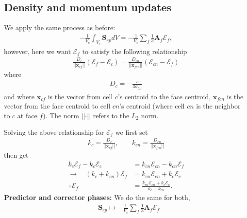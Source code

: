 \documentclass[10pt,letterpaper,notitlepage]{article}
\numberwithin{equation}{section}
\newcommand{\position}{\mathbf{x}}
\newcommand{\dotp}{\boldsymbol{\cdot}}
\newcommand{\RadE}{\mathcal{E}}
\newcommand{\AreaVec}{\mathbf{A}}
\newcommand{\beq}{\begin{equation*} \begin{aligned}}
\newcommand{\eeq}{\end{aligned}\end{equation*}}
\newcommand{\beqn}{\begin{equation}\begin{aligned}}
\newcommand{\eeqn}{\end{aligned}\end{equation}}
\begin{document}
\newpage
\subsection{Density and momentum updates} 
\label{section:fv_density_momentum_update}
We apply the same process as before:
\beqn 
-\frac{1}{V_c} \int_{V_c} \mathbf{S}_{rp} dV = -\frac{1}{V_c}  \sum_f \frac{1}{3} \AreaVec_f \RadE_f,
\eeqn 
however, here we want $\RadE_f$ to satisfy the following relationship
\beqn 
\frac{D_c}{||\position_{cf}||} (\RadE_f - \RadE_c) = 
\frac{D_{cn}}{||\position_{fcn}||} (\RadE_{cn} - \RadE_f) 
\eeqn 
where
\beqn 
D_c = -\frac{c}{3\sigma_{t,c}}
\eeqn 
and where $\position_{cf}$ is the vector from cell $c$'s centroid to the face centroid, $\position_{fcn}$ is the vector from the face centroid to cell $cn$'s centroid (where cell $cn$ is the neighbor to $c$ at face $f$). The norm $||\dotp||$ refers to the $L_2$ norm.

Solving the above relationship for $\RadE_f$ we first set
\beq 
k_c = \frac{D_c}{||\position_{cf}||} , \quad \quad
k_{cn} = \frac{D_{cn}}{||\position_{fcn}||}
\eeq 
then get
\beqn 
k_c \RadE_f - k_c \RadE_c &= k_{cn}  \RadE_{cn} - k_{cn}  \RadE_f \\
\to \quad 
(k_c + k_{cn} ) \RadE_f &= k_{cn}  \RadE_{cn} + k_c \RadE_c \\
\therefore
\RadE_f &= \frac{k_{cn}  \RadE_{cn} + k_c \RadE_c}{k_c +k_{cn} } .
\eeqn 
\newline
\newline 
\textbf{Predictor and corrector phases:} \newline 
We do the same for both,
\beqn
-\mathbf{S}_{rp} \mapsto  -\frac{1}{V_c}  \sum_f  \frac{1}{3} \AreaVec_f \RadE_f
\eeqn
\end{document}
